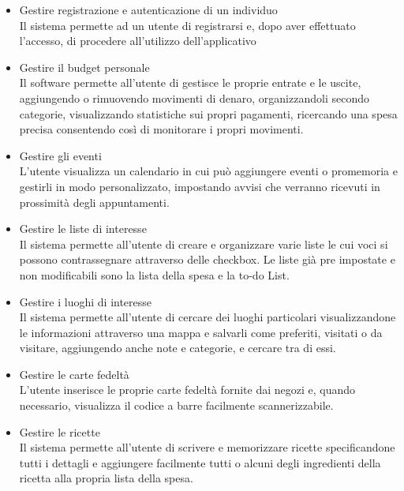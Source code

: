 \documentclass[a4paper,12pt]{article}
\begin{document}
\begin{itemize}
 \setlength\itemsep{0.01em}

\item {\sffamily  Gestire registrazione e autenticazione di un individuo } 
\\Il sistema permette ad un utente di registrarsi e, dopo aver effettuato l'accesso, di procedere all'utilizzo dell'applicativo
\item {\sffamily Gestire il budget personale } 
\\Il software permette all'utente di gestisce le proprie entrate e le uscite, aggiungendo o rimuovendo movimenti di denaro, organizzandoli secondo categorie, visualizzando statistiche sui propri pagamenti, ricercando una spesa precisa consentendo così di monitorare i propri movimenti.
\item {\sffamily Gestire gli eventi } 
\\L'utente visualizza un calendario in cui può aggiungere eventi o promemoria e gestirli in modo personalizzato, impostando avvisi che verranno ricevuti in prossimità degli appuntamenti.
\item {\sffamily  Gestire le liste di interesse} 
\\ Il sistema permette all'utente di creare e organizzare varie liste le cui voci si possono contrassegnare attraverso delle checkbox. Le liste già pre impostate e non modificabili sono la lista della spesa e la to-do List.
\item {\sffamily Gestire i luoghi di interesse } 
\\Il sistema permette all'utente di cercare dei luoghi particolari visualizzandone le informazioni attraverso una mappa e salvarli come preferiti, visitati o da visitare, aggiungendo anche note e categorie, e cercare tra di essi.
\item {\sffamily Gestire le carte fedeltà } 
\\L'utente inserisce le proprie carte fedeltà fornite dai negozi e, quando necessario, visualizza il codice a barre facilmente scannerizzabile.
\item {\sffamily Gestire le ricette} 
\\ Il sistema permette all'utente di scrivere e memorizzare ricette specificandone tutti i dettagli e aggiungere facilmente tutti o alcuni degli ingredienti della ricetta alla propria lista della spesa.

\end{itemize}
\end{document}
